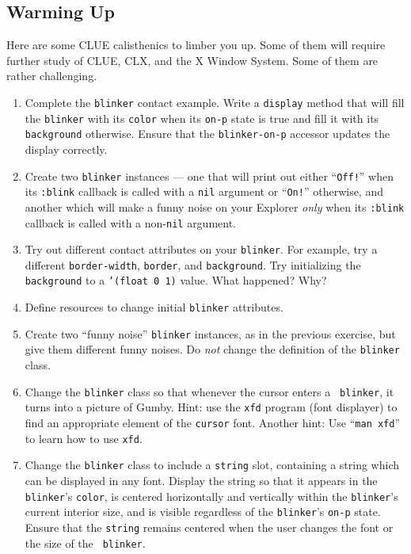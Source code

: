 \subsection{Warming Up}
Here are some CLUE calisthenics to limber you up. Some of them
will require further study of CLUE, CLX, and the X Window System. Some of them
are rather challenging.

\begin{enumerate}
\item Complete the {\tt blinker} contact example. Write a {\tt display} method
that will fill the {\tt blinker} with its {\tt color} when its {\tt on-p}
state is
true and fill it with its {\tt background} otherwise. Ensure
that the {\tt blinker-on-p} accessor updates the display correctly.

\item Create two  {\tt blinker} instances --- one that will print out either
``{\tt Off!}'' when
its {\tt :blink} callback is called with a {\tt nil} argument or ``{\tt On!}''
otherwise, and another which will make a funny noise on your Explorer {\em only}
when its {\tt :blink} callback is called with a non-{\tt nil} argument.

\item Try out different contact attributes on your {\tt blinker}. For example,
try a different {\tt border-width}, {\tt border}, and {\tt background}. Try
initializing the {\tt background} to a {\tt '(float 0 1)} value. What happened?
Why?

\item Define resources to change initial {\tt blinker} attributes.

\item Create two ``funny noise'' {\tt blinker} instances, as in the previous
exercise, but give them different funny noises. Do {\em not} change the
definition of the {\tt blinker} class.

\item Change the {\tt blinker} class so that whenever the cursor enters a {\tt
blinker}, it turns into a picture of Gumby. Hint: use the {\tt xfd} program
(font displayer) to find an appropriate element of the {\tt cursor} font.
Another hint: Use ``{\tt man xfd}'' to learn how to use {\tt xfd}.

\item Change the {\tt blinker} class to include a {\tt string} slot, containing
a string which can be displayed in any font. Display the string so that it
appears in the {\tt blinker}'s {\tt color}, is centered horizontally and
vertically within the {\tt blinker}'s current interior size, and is visible
regardless of the {\tt blinker}'s {\tt on-p} state. Ensure that the {\tt string}
remains centered when the user changes the font or the size of the {\tt
blinker}.


\end{enumerate}
